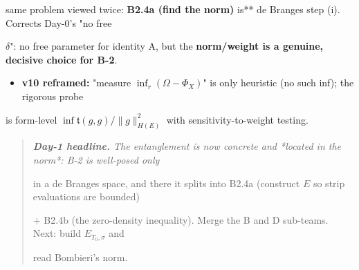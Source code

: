 \documentclass[10pt]{article}
\begin{document}
  same problem viewed twice:\textbf{ B2.4a (find the norm) }is** de Branges step (i). Corrects Day-0's "no free\par
  $\delta$": no free parameter for identity A, but the \textbf{norm/weight is a genuine, decisive choice for B-2}.\par
\begin{itemize}
\item \textbf{v10 reframed:} "measure $\inf_r(\Omega-\Phi_X)$" is only heuristic (no such inf); the rigorous probe
\end{itemize}
  is form-level $\inf\mathfrak t(g,g)/\|g\|_{H(E)}^2$ with sensitivity-to-weight testing.\par

\begin{quote}\itshape
\textbf{Day-1 headline.} The entanglement is now concrete and *located in the norm*: B-2 is well-posed only\par
in a de Branges space, and there it splits into B2.4a (construct $E$ so strip evaluations are bounded)\par
+ B2.4b (the zero-density inequality). Merge the B and D sub-teams. Next: build $E_{T_0,\sigma}$ and\par
read Bombieri's norm.\par
\end{quote}
\end{document}
